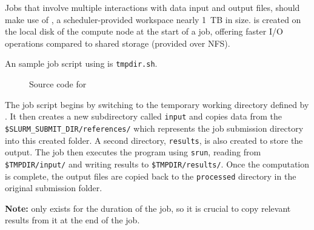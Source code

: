 \noindent Jobs that involve multiple interactions with data input and output files, should make use of ,
a scheduler-provided workspace nearly 1~TB in size.
 is created on the local disk of the compute node at the start of a job, offering faster I/O operations
compared to shared storage (provided over NFS).

\noindent An sample job script using  is \texttt{tmpdir.sh}.

\small
\begin{figure}[htpb]
	
	\caption{Source code for }
	\label{fig:tmpdir.sh}
\end{figure}
\normalsize

\noindent The job script begins by switching to the temporary working directory defined by .
It then creates a new subdirectory called \texttt{input} and copies data from the
\texttt{\$SLURM\_SUBMIT\_DIR/references/} which represents the job submission directory into this created folder.
A second directory, \texttt{results}, is also created to store the output. The job then executes the program using \texttt{srun}, 
reading from \texttt{\$TMPDIR/input/} and writing results to \texttt{\$TMPDIR/results/}. 
Once the computation is complete, the output files are copied back to the \texttt{processed} directory in the original submission folder.

\noindent \textbf{Note:}  only exists for the duration of the job, so it is crucial to copy relevant results from it at the end of the job.
